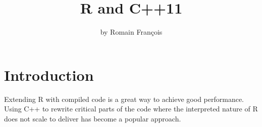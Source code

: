 \title{R and C++11}
\author{by Romain François}

\maketitle

\abstract{}

\section{Introduction}

Extending R with compiled code is a great way to achieve good performance. 
Using C++ to rewrite critical parts of the code where the interpreted nature of R 
does not scale to deliver has become a popular approach. 




\address{Romain François\\
    R Enthusiasts\\
    1 place de l'égalité. 42400 Saint Chamond\\
    FRANCE }
    

